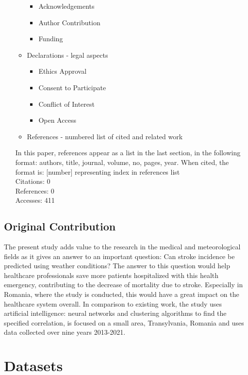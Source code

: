 \documentclass{article}
\begin{document}
\begin{itemize}
\begin{itemize}
\begin{itemize}
    \item Acknowledgements
    \item Author Contribution
    \item Funding
\end{itemize}
\item Declarations - legal aspects
\begin{itemize}
    \item Ethics Approval
    \item Consent to Participate
    \item Conflict of Interest
    \item Open Access
\end{itemize}
\item References - numbered list of cited and related work
\end{itemize}
In this paper, references appear as a list in the last section, in the following format: authors, title, journal, volume, no, pages, year. When cited, the format is: [number] representing index in references list\\

Citations: 0\\
References: 0\\
Accesses: 411
\end{itemize}

\subsection{Original Contribution}

The present study adds value to the research in the medical and meteorological fields as it gives an answer to an important question: Can stroke incidence be predicted using weather conditions? The answer to this question would help healthcare professionals save more patients hospitalized with this health emergency, contributing to the decrease of mortality due to stroke. Especially in Romania, where the study is conducted, this would have a great impact on the healthcare system overall. In comparison to existing work, the study uses artificial intelligence: neural networks and clustering algorithms to find the specified correlation, is focused on a small area, Transylvania, Romania and uses data collected over nine years 2013-2021. 

\newpage
\section{Datasets}
\end{document}

